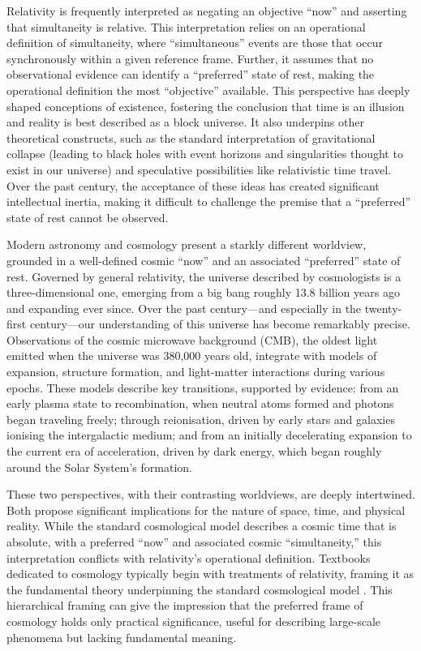 \documentclass[aps,rmp,groupedaddress,twocolumn,10pt]{revtex4-2}
\begin{document}
Relativity is frequently interpreted as negating an objective ``now'' and asserting that simultaneity is relative. This interpretation relies on an operational definition of simultaneity, where ``simultaneous'' events are those that occur synchronously within a given reference frame. Further, it assumes that no observational evidence can identify a ``preferred'' state of rest, making the operational definition the most ``objective'' available. This perspective has deeply shaped conceptions of existence, fostering the conclusion that time is an illusion and reality is best described as a block universe. It also underpins other theoretical constructs, such as the standard interpretation of gravitational collapse (leading to black holes with event horizons and singularities thought to exist in our universe) and speculative possibilities like relativistic time travel. Over the past century, the acceptance of these ideas has created significant intellectual inertia, making it difficult to challenge the premise that a ``preferred'' state of rest cannot be observed.

Modern astronomy and cosmology present a starkly different worldview, grounded in a well-defined cosmic ``now'' and an associated ``preferred'' state of rest. Governed by general relativity, the universe described by cosmologists is a three-dimensional one, emerging from a big bang roughly 13.8 billion years ago and expanding ever since. Over the past century---and especially in the twenty-first century---our understanding of this universe has become remarkably precise. Observations of the cosmic microwave background (CMB), the oldest light emitted when the universe was 380,000 years old, integrate with models of expansion, structure formation, and light-matter interactions during various epochs. These models describe key transitions, supported by evidence: from an early plasma state to recombination, when neutral atoms formed and photons began traveling freely; through reionisation, driven by early stars and galaxies ionising the intergalactic medium; and from an initially decelerating expansion to the current era of acceleration, driven by dark energy, which began roughly around the Solar System's formation.

These two perspectives, with their contrasting worldviews, are deeply intertwined. Both propose significant implications for the nature of space, time, and physical reality. While the standard cosmological model describes a cosmic time that is absolute, with a preferred ``now'' and associated cosmic ``simultaneity,'' this interpretation conflicts with relativity's operational definition. Textbooks dedicated to cosmology typically begin with treatments of relativity, framing it as the fundamental theory underpinning the standard cosmological model \cite{Ryden2017}. This hierarchical framing can give the impression that the preferred frame of cosmology holds only practical significance, useful for describing large-scale phenomena but lacking fundamental meaning.
\end{document}
